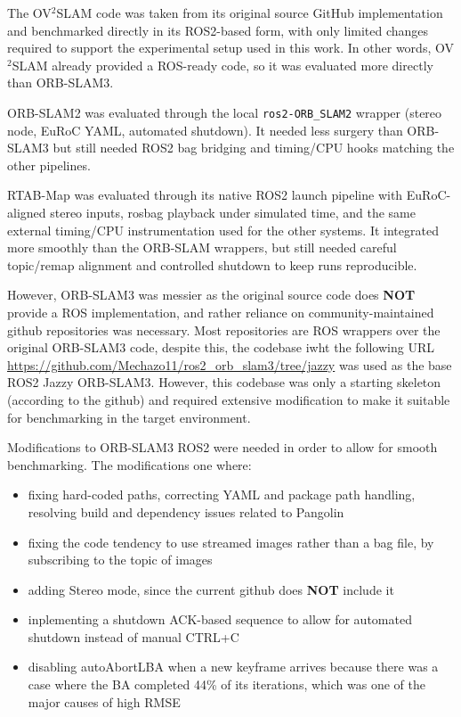 \documentclass[11pt]{article}
\begin{document}
The OV$^{2}$SLAM code was taken from its original source GitHub implementation and benchmarked directly in its ROS2-based form, with only limited changes required to support the experimental setup used in this work. In other words, OV$^{2}$SLAM already provided a ROS-ready code, so it was evaluated more directly than ORB-SLAM3.

ORB-SLAM2 was evaluated through the local \texttt{ros2-ORB\_SLAM2} wrapper (stereo node, EuRoC YAML, automated shutdown). It needed less surgery than ORB-SLAM3 but still needed ROS2 bag bridging and timing/CPU hooks matching the other pipelines.

RTAB-Map was evaluated through its native ROS2 launch pipeline with EuRoC-aligned stereo inputs, rosbag playback under simulated time, and the same external timing/CPU instrumentation used for the other systems. It integrated more smoothly than the ORB-SLAM wrappers, but still needed careful topic/remap alignment and controlled shutdown to keep runs reproducible.

However, ORB-SLAM3 was messier as the original source code does \textbf{NOT} provide a ROS implementation, and rather reliance on community-maintained github repositories was necessary. Most repositories are ROS wrappers over the original ORB-SLAM3 code, despite this, the codebase iwht the following URL \url{https://github.com/Mechazo11/ros2_orb_slam3/tree/jazzy} was used as the base ROS2 Jazzy ORB-SLAM3. However, this codebase was only a starting skeleton (according to the github) and required extensive modification to make it suitable for benchmarking in the target environment.

Modifications to ORB-SLAM3 ROS2 were needed in order to allow for smooth benchmarking.
The modifications one where:
\begin{itemize}
    \item fixing hard-coded paths, correcting YAML and package path handling, resolving build and dependency issues related to Pangolin
    \item fixing the code tendency to use streamed images rather than a bag file, by subscribing to the topic of images
    \item adding Stereo mode, since the current github does \textbf{NOT} include it
    \item inplementing a shutdown ACK-based sequence to allow for automated shutdown instead of manual CTRL+C
    \item disabling autoAbortLBA when a new keyframe arrives because there was a case where the BA completed 44\% of its iterations, which was one of the major causes of high RMSE
\end{itemize}
\end{document}

